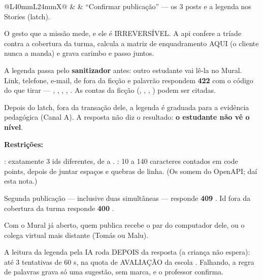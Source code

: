 \begin{tabularx}{\linewidth}{@{}L{40mm}L{24mm}X@{}}
\zebra {} &  & \enquote{Confirmar publicação} --- os 3 posts e a legenda nos Stories (latch).\par O gesto que a missão mede, e ele é IRREVERSÍVEL. A api confere a tríade contra a cobertura da turma, calcula a matriz de enquadramento AQUI (o cliente nunca a manda) e grava carimbo e passo juntos.\par A legenda passa pelo \textbf{sanitizador} antes: outro estudante vai lê-la no Mural. Link, telefone, e-mail,  de fora da ficção e palavrão respondem \textbf{422} com o código do que tirar --- , , , , . As contas da ficção (, , , ) podem ser citadas.\par Depois do latch, fora da transação dele, a legenda é graduada para a evidência pedagógica (Canal A). A resposta não diz o resultado: \textbf{o estudante não vê o nível}.\par \textbf{Restrições:}\par \hspace*{1em}\textbullet{} : exatamente 3 ids diferentes, de  a . : 10 a 140 caracteres contados em code points, depois de juntar espaços e quebras de linha. (Os  somem do OpenAPI; daí esta nota.)\par \hspace*{1em}\textbullet{} Segunda publicação --- inclusive duas simultâneas --- responde \textbf{409} . Id fora da cobertura da turma responde \textbf{400} .\par \hspace*{1em}\textbullet{} Com o Mural já aberto, quem publica recebe o par do computador dele, ou o colega virtual mais distante (Tomás ou Malu).\par \hspace*{1em}\textbullet{} A leitura da legenda pela IA roda DEPOIS da resposta (a criança não espera): até 3 tentativas de 60 s, na quota de AVALIAÇÃO da escola . Falhando, a regra de palavras grava só uma sugestão, sem marca, e o professor confirma.\\

\end{tabularx}
